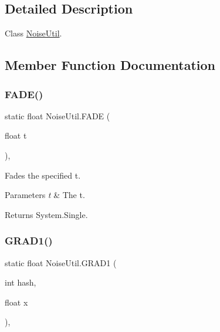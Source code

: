 \subsection{Detailed Description}
Class \hyperlink{class_noise_util}{Noise\+Util}. 



\subsection{Member Function Documentation}
\mbox{\label{class_noise_util_a0b86dd13deace2f2e95c562f1d123d61}} 
\subsubsection{\texorpdfstring{F\+A\+D\+E()}{FADE()}}
{\footnotesize\ttfamily static float Noise\+Util.\+F\+A\+DE (\begin{DoxyParamCaption}\item[{float}]{t }\end{DoxyParamCaption})\hspace{0.3cm}{\ttfamily [inline]}, {\ttfamily [static]}}



Fades the specified t. 


\begin{DoxyParams}{Parameters}
{\em t} & The t.\\
\hline
\end{DoxyParams}
\begin{DoxyReturn}{Returns}
System.\+Single.
\end{DoxyReturn}
\mbox{\label{class_noise_util_a953eb5cfd98c62cade6658e8daf9c19c}} 
\subsubsection{\texorpdfstring{G\+R\+A\+D1()}{GRAD1()}}
{\footnotesize\ttfamily static float Noise\+Util.\+G\+R\+A\+D1 (\begin{DoxyParamCaption}\item[{int}]{hash,  }\item[{float}]{x }\end{DoxyParamCaption})\hspace{0.3cm}{\ttfamily [inline]}, {\ttfamily [static]}}



